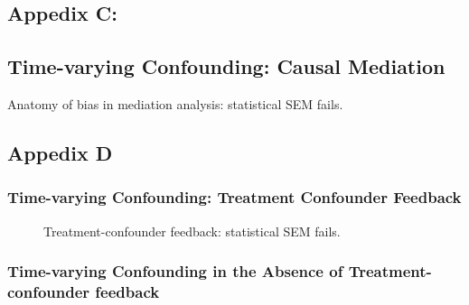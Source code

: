 \documentclass[
  single column]{article}
\begin{document}
\newpage{}

\subsection{Appedix C:}\label{appedix-c}

\subsection{Time-varying Confounding: Causal
Mediation}\label{time-varying-confounding-causal-mediation}

\begin{table}

\caption{\label{tbl-mediation}Anatomy of bias in mediation analysis:
statistical SEM fails.}

\centering{

\mediationfull

}

\end{table}%

\newpage{}

\subsection{Appedix D}\label{appedix-d}

\subsubsection{Time-varying Confounding: Treatment Confounder
Feedback}\label{time-varying-confounding-treatment-confounder-feedback}

\begin{figure}

\centering{

\feedbackA

}

\caption{\label{fig-timevarying-amplification}Treatment-confounder
feedback: statistical SEM fails.}

\end{figure}%

\newpage{}

\subsubsection{Time-varying Confounding in the Absence of
Treatment-confounder
feedback}\label{time-varying-confounding-in-the-absence-of-treatment-confounder-feedback}
\end{document}
